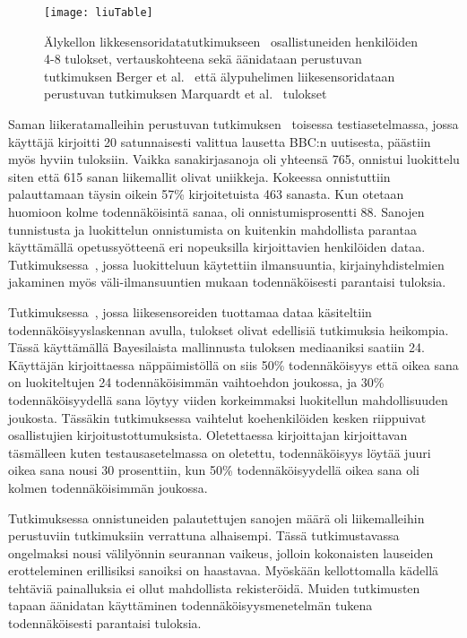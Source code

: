 \documentclass[finnish]{tktltiki2}
\theoremstyle{definition}
\theoremstyle{remark}
\begin{document}
\begin{figure} [!t]
\centering
\texttt{[image: liuTable]}
\caption{Älykellon likkesensoridatatutkimukseen~\cite{liu} osallistuneiden henkilöiden 4-8 tulokset, vertauskohteena sekä äänidataan perustuvan tutkimuksen Berger et al.~\cite{berger} että älypuhelimen liikesensoridataan perustuvan tutkimuksen Marquardt et al.~\cite{mar} tulokset}
\label{fig:liuTable}
\end{figure}

\pagebreak
Saman liikeratamalleihin perustuvan tutkimuksen~\cite{liu} toisessa testiasetelmassa, jossa käyttäjä kirjoitti 20 satunnaisesti valittua lausetta BBC:n uutisesta, päästiin myös hyviin tuloksiin. Vaikka sanakirjasanoja oli yhteensä 765, onnistui luokittelu siten että 615 sanan liikemallit olivat uniikkeja. Kokeessa onnistuttiin palauttamaan täysin oikein 57\% kirjoitetuista 463 sanasta. Kun otetaan huomioon kolme todennäköisintä sanaa, oli onnistumisprosentti 88.
Sanojen tunnistusta ja luokittelun onnistumista on kuitenkin mahdollista parantaa käyttämällä opetussyötteenä eri nopeuksilla kirjoittavien henkilöiden dataa. Tutkimuksessa~\cite{maiti}, jossa luokitteluun käytettiin ilmansuuntia, kirjainyhdistelmien jakaminen myös väli-ilmansuuntien mukaan todennäköisesti parantaisi tuloksia.

Tutkimuksessa~\cite{mole}, jossa liikesensoreiden tuottamaa dataa käsiteltiin todennäköisyyslaskennan avulla, tulokset olivat edellisiä tutkimuksia heikompia. Tässä käyttämällä Bayesilaista mallinnusta tuloksen mediaaniksi saatiin 24. Käyttäjän kirjoittaessa näppäimistöllä on siis 50\% todennäköisyys että oikea sana on luokiteltujen 24 todennäköisimmän vaihtoehdon joukossa, ja 30\% todennäköisyydellä sana löytyy viiden korkeimmaksi luokitellun mahdollisuuden joukosta. Tässäkin tutkimuksessa vaihtelut koehenkilöiden kesken riippuivat osallistujien kirjoitustottumuksista. Oletettaessa kirjoittajan kirjoittavan täsmälleen kuten testausasetelmassa on oletettu, todennäköisyys löytää juuri oikea sana nousi 30 prosenttiin, kun 50\% todennäköisyydellä oikea sana oli kolmen todennäköisimmän joukossa.

Tutkimuksessa onnistuneiden palautettujen sanojen määrä oli liikemalleihin perustuviin tutkimuksiin verrattuna alhaisempi. Tässä tutkimustavassa ongelmaksi nousi välilyönnin seurannan vaikeus, jolloin kokonaisten lauseiden erotteleminen erillisiksi sanoiksi on haastavaa. Myöskään kellottomalla kädellä tehtäviä painalluksia ei ollut mahdollista rekisteröidä. Muiden tutkimusten tapaan äänidatan käyttäminen todennäköisyysmenetelmän tukena todennäköisesti parantaisi tuloksia.
\end{document}
